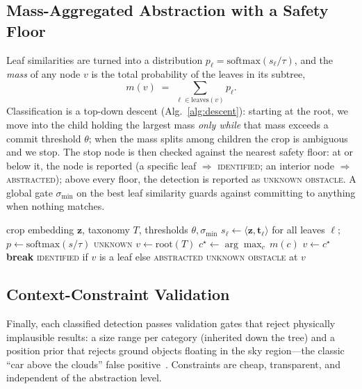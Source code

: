 \documentclass[conference]{IEEEtran}
\begin{document}
\subsection{Mass-Aggregated Abstraction with a Safety Floor}
Leaf similarities are turned into a distribution
$p_\ell = \mathrm{softmax}(s_\ell/\tau)$, and the \emph{mass} of any node $v$ is
the total probability of the leaves in its subtree,
\begin{equation}
m(v) \;=\; \sum_{\ell \in \mathrm{leaves}(v)} p_\ell .
\label{eq:mass}
\end{equation}
Classification is a top-down descent (Alg.~\ref{alg:descent}): starting at the
root, we move into the child holding the largest mass \emph{only while} that mass
exceeds a commit threshold $\theta$; when the mass splits among children the crop
is ambiguous and we stop. The stop node is then checked against the nearest
safety floor: at or below it, the node is reported (a specific leaf $\Rightarrow$
\textsc{identified}; an interior node $\Rightarrow$ \textsc{abstracted}); above
every floor, the detection is reported as \textsc{unknown obstacle}. A global
gate $\sigma_{\min}$ on the best leaf similarity guards against committing to
anything when nothing matches.

\begin{algorithm}[t]
\caption{Hierarchical abstraction with safety floor}
\label{alg:descent}
\begin{algorithmic}[1]
\REQUIRE crop embedding $\mathbf{z}$, taxonomy $T$, thresholds $\theta,\sigma_{\min}$
\STATE $s_\ell \gets \langle\mathbf{z},\mathbf{t}_\ell\rangle$ for all leaves $\ell$;\quad
       $p \gets \mathrm{softmax}(s/\tau)$
    \RETURN \textsc{unknown} 
\ENDIF
\STATE $v \gets \mathrm{root}(T)$
    \STATE $c^\star \gets \arg\max_{c}\, m(c)$ 
        \STATE $v \gets c^\star$
    \ELSE
        \STATE \textbf{break} 
    \ENDIF
\ENDWHILE
{}
    \RETURN \textsc{identified} if $v$ is a leaf else \textsc{abstracted}
\ELSE
    \RETURN \textsc{unknown obstacle} at $v$
\ENDIF
\end{algorithmic}
\end{algorithm}

\subsection{Context-Constraint Validation}
Finally, each classified detection passes validation gates that reject
physically implausible results: a size range per category (inherited down the
tree) and a position prior that rejects ground objects floating in the sky
region---the classic ``car above the clouds'' false positive~\cite{schaller2025}.
Constraints are cheap, transparent, and independent of the abstraction level.
\end{document}
